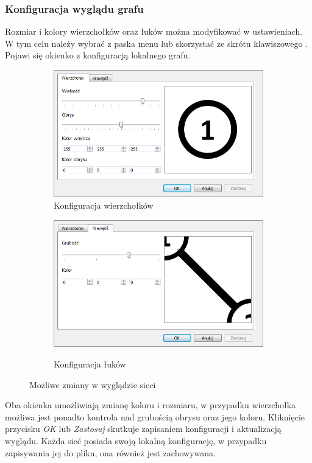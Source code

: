 \subsubsection{Konfiguracja wyglądu grafu}
Rozmiar i kolory wierzchołków oraz łuków można modyfikować w ustawieniach. W tym celu należy wybrać z paska menu  lub skorzystać ze skrótu klawiszowego . Pojawi się okienko z konfiguracją lokalnego grafu.
\begin{figure}[H]
	\centering
	\begin{subfigure}{0.45\textwidth}
		\includegraphics[width=0.9\linewidth]{./img/spec_zew04_1.png}
		\caption{Konfiguracja wierzchołków}
		\label{fig:grafConfig1}
	\end{subfigure}
	\begin{subfigure}{0.45\textwidth}
		\includegraphics[width=0.9\linewidth]{./img/spec_zew04_2.png}
		\label{fig:grafConfig2}
		\caption{Konfiguracja łuków}
	\end{subfigure}
	\caption{Możliwe zmiany w wyglądzie sieci}
	\label{fig:grafConfig}
\end{figure}
Oba okienka umożliwiają zmianę koloru i rozmiaru, w przypadku wierzchołka możliwa jest ponadto kontrola nad grubością obrysu oraz jego koloru. Kliknięcie przycisku \textit{OK} lub \textit{Zastosuj} skutkuje zapisaniem konfiguracji i aktualizacją wyglądu. Każda sieć posiada swoją lokalną konfigurację, w przypadku zapisywania jej do pliku, ona również jest zachowywana.
